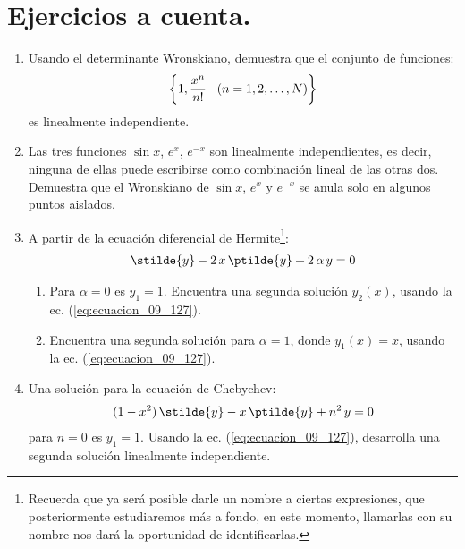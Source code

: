 \section{Ejercicios a cuenta.}

\begin{enumerate}
\item Usando el determinante Wronskiano, demuestra que el conjunto de funciones:
\begin{align*}
\left\{ 1, \dfrac{x^{n}}{n!} \hspace{0.3cm} (n = 1, 2, \ldots, N) \right\}    
\end{align*}
es linealmente independiente.
\item Las tres funciones $\sin x$, $e^{x}$, $e^{-x}$ son linealmente independientes, es decir, ninguna de ellas puede escribirse como combinación lineal de las otras dos. Demuestra que el Wronskiano de $\sin x$, $e^{x}$ y $e^{-x}$ se anula solo en algunos puntos aislados.
\item A partir de la ecuación diferencial de Hermite\footnote{Recuerda que ya será posible darle un nombre a ciertas expresiones, que posteriormente estudiaremos más a fondo, en este momento, llamarlas con su nombre nos dará la oportunidad de identificarlas.}:
\begin{align*}
\stilde{y} - 2 \, x \, \ptilde{y} +  2 \, \alpha \, y = 0
\end{align*}
\begin{enumerate}
\item Para $\alpha = 0$ es $y_{1} = 1$. Encuentra una segunda solución $y_{2}(x)$, usando la ec. (\ref{eq:ecuacion_09_127}).
\item Encuentra una segunda solución para $\alpha = 1$, donde $y_{1}(x) = x$, usando la ec. (\ref{eq:ecuacion_09_127}).
\end{enumerate}
\item Una solución para la ecuación de Chebychev:
\begin{align*}
(1 - x^{2}) \, \stilde{y} -  x \, \ptilde{y} + n^{2} \, y = 0
\end{align*}
para $n = 0$ es $y_{1} = 1$.
Usando la ec. (\ref{eq:ecuacion_09_127}), desarrolla una segunda solución linealmente independiente.
\end{enumerate}


